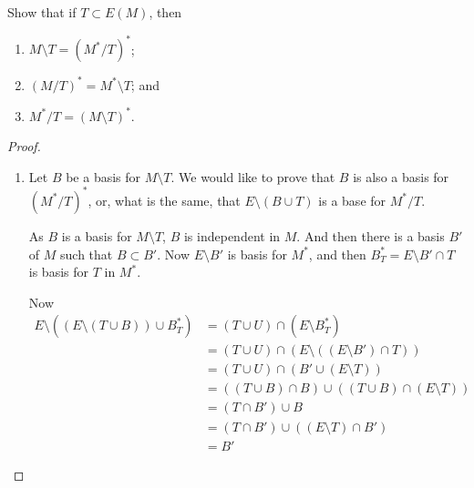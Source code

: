 \prob
{
	Show that if $T \subset E(M)$, then\pn
	\begin{enumerate}[label=(\roman*)]
		\item $M \setminus T = (M^* / T)^*$;
		\item $(M / T)^* = M^* \setminus T$; and
		\item $M^* / T = (M \setminus T)^*$.
	\end{enumerate}
}
\begin{proof}
    \begin{enumerate}[label=(\roman*)]
        \item 
            Let $B$ be a basis for $M \setminus T$. We would like to prove that
            $B$ is also a basis for $(M^* / T)^*$, or, what is the same, 
            that $E \setminus (B \cup T)$ is a base for $M^* / T$.\pn
            
            As $B$ is a basis for $M \setminus T$, $B$ is independent in $M$. And then
            there is a basis $B'$ of $M$ such that $B \subset B'$. Now $E \setminus B'$
            is basis for $M^*$, and then $B^*_T = E \setminus B' \cap T$ is basis for $T$ in
            $M^*$.
            
            Now
            \begin{align}
                E \setminus ((E \setminus (T \cup B)) \cup B^*_T)   &=  (T \cup U) \cap (E \setminus B^*_T)                                 \\
                                                                    &=  (T \cup U) \cap (E \setminus ((E\setminus B') \cap T))              \\
                                                                    &=  (T \cup U) \cap (B'\cup (E \setminus T))                            \\
                                                                    &=  ((T \cup B) \cap B) \cup ((T \cup B) \cap( E\setminus T))           \\
                                                                    &=  (T \cap B') \cup B                                                  \\
                                                                    &=  (T \cap B') \cup ((E \setminus T) \cap B')                          \\
                                                                    &=  B'
            \end{align}
            

\end{enumerate}
\end{proof}
